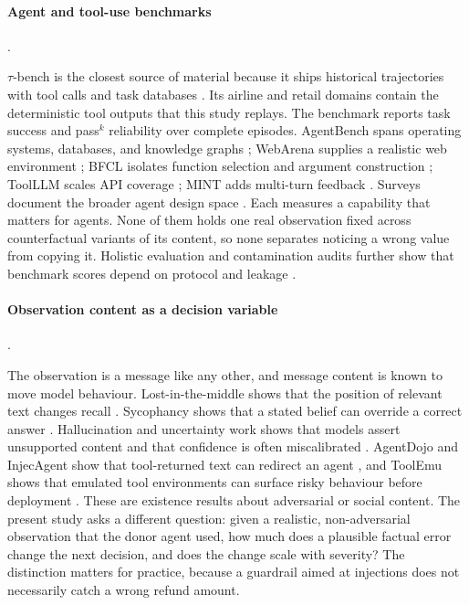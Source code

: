 \documentclass[a4paper,fleqn]{cas-sc}
\begin{document}
\paragraph{Agent and tool-use benchmarks}.\

$\tau$-bench is the closest source of material because it ships historical trajectories with
tool calls and task databases \cite{taubench}. Its airline and retail domains contain the
deterministic tool outputs that this study replays. The benchmark reports task success and
pass$^k$ reliability over complete episodes. AgentBench spans operating systems, databases, and
knowledge graphs \cite{agentbench}; WebArena supplies a realistic web environment
\cite{webarena}; BFCL isolates function selection and argument construction \cite{bfcl}; ToolLLM
scales API coverage \cite{toolllm}; MINT adds multi-turn feedback \cite{mint}. Surveys document
the broader agent design space \cite{agent_survey}. Each measures a
capability that matters for agents. None of them holds one real observation fixed across
counterfactual variants of its content, so none separates noticing a wrong value from copying
it. Holistic evaluation and contamination audits further show that benchmark scores depend on
protocol and leakage \cite{helm,contamination}.

\paragraph{Observation content as a decision variable}.\

The observation is a message like any other, and message content is known to move model
behaviour. Lost-in-the-middle shows that the position of relevant text changes recall
\cite{lostmiddle}. Sycophancy shows that a stated belief can override a correct answer
\cite{sycophancy}. Hallucination and uncertainty work shows that models assert unsupported
content and that confidence is often miscalibrated
\cite{truthfulqa,halueval,selfcheckgpt,semantic_uncertainty,calibration,ovadia}. AgentDojo and
InjecAgent show that tool-returned text can redirect an agent
\cite{agentdojo,injecagent}, and ToolEmu shows that emulated tool environments can surface risky
behaviour before deployment \cite{toolemu}. These are existence results about adversarial or
social content. The present study asks a different question: given a realistic, non-adversarial
observation that the donor agent used, how much does a plausible factual error change the next
decision, and does the change scale with severity? The distinction matters for practice, because
a guardrail aimed at injections does not necessarily catch a wrong refund amount.
\end{document}
